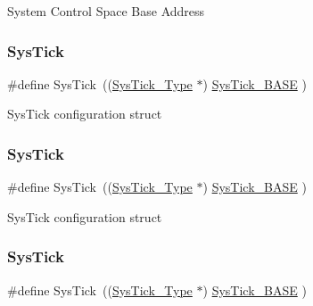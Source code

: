 System Control Space Base Address \mbox{\label{group___c_m_s_i_s__core__base_gacd96c53beeaff8f603fcda425eb295de}} 
\subsubsection{\texorpdfstring{SysTick}{SysTick}\hspace{0.1cm}{\footnotesize\ttfamily [1/6]}}
{\footnotesize\ttfamily \#define Sys\+Tick~((\mbox{\hyperlink{struct_sys_tick___type}{Sys\+Tick\+\_\+\+Type}}   $\ast$)     \mbox{\hyperlink{group___c_m_s_i_s__core__base_ga58effaac0b93006b756d33209e814646}{Sys\+Tick\+\_\+\+B\+A\+SE}}  )}

Sys\+Tick configuration struct \mbox{\label{group___c_m_s_i_s__core__base_gacd96c53beeaff8f603fcda425eb295de}} 
\subsubsection{\texorpdfstring{SysTick}{SysTick}\hspace{0.1cm}{\footnotesize\ttfamily [2/6]}}
{\footnotesize\ttfamily \#define Sys\+Tick~((\mbox{\hyperlink{struct_sys_tick___type}{Sys\+Tick\+\_\+\+Type}}   $\ast$)     \mbox{\hyperlink{group___c_m_s_i_s__core__base_ga58effaac0b93006b756d33209e814646}{Sys\+Tick\+\_\+\+B\+A\+SE}}  )}

Sys\+Tick configuration struct \mbox{\label{group___c_m_s_i_s__core__base_gacd96c53beeaff8f603fcda425eb295de}} 
\subsubsection{\texorpdfstring{SysTick}{SysTick}\hspace{0.1cm}{\footnotesize\ttfamily [3/6]}}
{\footnotesize\ttfamily \#define Sys\+Tick~((\mbox{\hyperlink{struct_sys_tick___type}{Sys\+Tick\+\_\+\+Type}}   $\ast$)     \mbox{\hyperlink{group___c_m_s_i_s__core__base_ga58effaac0b93006b756d33209e814646}{Sys\+Tick\+\_\+\+B\+A\+SE}}  )}

